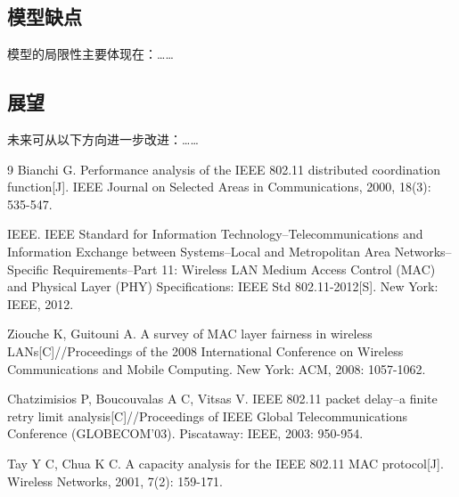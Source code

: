 \documentclass[bwprint]{gmcmthesis}
\begin{document}
\subsection{模型缺点}
模型的局限性主要体现在：……

\subsection{展望}
未来可从以下方向进一步改进：……

\clearpage
\begin{thebibliography}{9}
 Bianchi G. Performance analysis of the IEEE 802.11 distributed coordination function[J]. IEEE Journal on Selected Areas in Communications, 2000, 18(3): 535-547.

 IEEE. IEEE Standard for Information Technology--Telecommunications and Information Exchange between Systems--Local and Metropolitan Area Networks--Specific Requirements--Part 11: Wireless LAN Medium Access Control (MAC) and Physical Layer (PHY) Specifications: IEEE Std 802.11-2012[S]. New York: IEEE, 2012.

 Ziouche K, Guitouni A. A survey of MAC layer fairness in wireless LANs[C]//Proceedings of the 2008 International Conference on Wireless Communications and Mobile Computing. New York: ACM, 2008: 1057-1062.

 Chatzimisios P, Boucouvalas A C, Vitsas V. IEEE 802.11 packet delay--a finite retry limit analysis[C]//Proceedings of IEEE Global Telecommunications Conference (GLOBECOM'03). Piscataway: IEEE, 2003: 950-954.

 Tay Y C, Chua K C. A capacity analysis for the IEEE 802.11 MAC protocol[J]. Wireless Networks, 2001, 7(2): 159-171.
\end{thebibliography}
\end{document}
